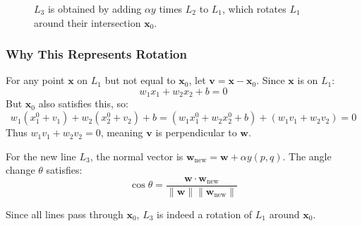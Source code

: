 \begin{notechapter}
\begin{figure}[H]
\caption{$L_3$ is obtained by adding $\alpha y$ times $L_2$ to $L_1$, which rotates $L_1$ around their intersection $\mathbf{x}_0$.}
\end{figure}

\subsubsection{Why This Represents Rotation}

For any point $\mathbf{x}$ on $L_1$ but not equal to $\mathbf{x}_0$, let $\mathbf{v} = \mathbf{x} - \mathbf{x}_0$. Since $\mathbf{x}$ is on $L_1$:
\[
w_1 x_1 + w_2 x_2 + b = 0
\]
But $\mathbf{x}_0$ also satisfies this, so:
\[
w_1 (x_1^0 + v_1) + w_2 (x_2^0 + v_2) + b = (w_1 x_1^0 + w_2 x_2^0 + b) + (w_1 v_1 + w_2 v_2) = 0
\]
Thus $w_1 v_1 + w_2 v_2 = 0$, meaning $\mathbf{v}$ is perpendicular to $\mathbf{w}$.

For the new line $L_3$, the normal vector is $\mathbf{w}_{\text{new}} = \mathbf{w} + \alpha y (p, q)$. The angle change $\theta$ satisfies:
\[
\cos\theta = \frac{\mathbf{w} \cdot \mathbf{w}_{\text{new}}}{\|\mathbf{w}\| \|\mathbf{w}_{\text{new}}\|}
\]

Since all lines pass through $\mathbf{x}_0$, $L_3$ is indeed a rotation of $L_1$ around $\mathbf{x}_0$.


\end{notechapter}
